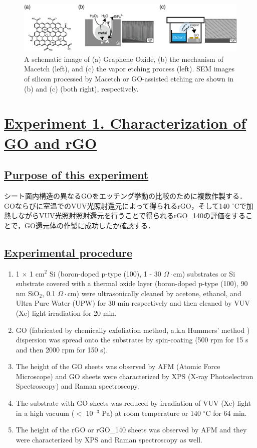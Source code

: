\documentclass[platex,dvipdfmx]{jlreq}			%
\begin{document}
\begin{figure}
    \centering
    \includegraphics[width=150mm]{figures/figure1.png}
    \caption{A schematic image of (a) Graphene Oxide, (b) the mechanism of Macetch (left), and (c) the vapor etching process (left). SEM images of silicon processed by Macetch or GO-assisted etching are shown in (b) and (c) (both right), respectively.}
    \label{fig:schematic_model}
\end{figure}

\section*{\ul{Experiment 1. Characterization of GO and rGO}}

\subsection*{\ul{Purpose of this experiment}}
シート面内構造の異なるGOをエッチング挙動の比較のために複数作製する．
GOならびに室温でのVUV光照射還元によって得られるrGO，そして140 ${}^\circ$Cで加熱しながらVUV光照射照射還元を行うことで得られるrGO\_140の評価をすることで，GO還元体の作製に成功したか確認する．

\subsection*{\ul{Experimental procedure}}
\begin{enumerate}
    \item 1 $\times$ 1 cm$^2$ Si (boron-doped p-type (100), 1 - 30 $\Omega\cdot$cm) substrates or Si substrate covered with a thermal oxide layer (boron-doped p-type (100), 90 nm SiO$_2$, 0.1 $\Omega\cdot$cm) were ultrasonically cleaned by acetone, ethanol, and Ultra Pure Water (UPW) for 30 min respectively and then cleaned by VUV (Xe) light irradiation for 20 min.
    \item GO (fabricated by chemically exfoliation method, a.k.a Hummers' method ) dispersion was spread onto the substrates by spin-coating (500 rpm for 15 s and then 2000 rpm for 150 s).
    \item The height of the GO sheets was observed by AFM (Atomic Force Microscope) and GO sheets were characterized by XPS (X-ray Photoelectron Spectroscopy) and Raman spectroscopy.
    \item The substrate with GO sheets was reduced by irradiation of VUV (Xe) light in a high vacuum ($<$ 10$^{-3}$ Pa) at room temperature or 140 ${}^\circ$C for 64 min.
    \item The height of the rGO or rGO\_140 sheets was observed by AFM and they were characterized by XPS and Raman spectroscopy as well.
\end{enumerate}
\end{document}
